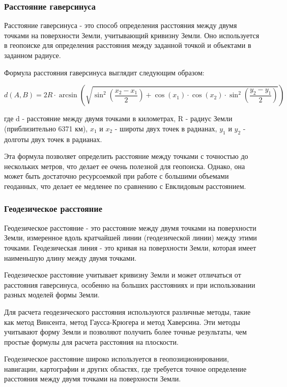 \subsubsection{Расстояние гаверсинуса}
Расстояние гаверсинуса - это способ определения расстояния между двумя точками на поверхности Земли, учитывающий кривизну Земли. Оно используется в геопоиске для определения расстояния между заданной точкой и объектами в заданном радиусе.

Формула расстояния гаверсинуса выглядит следующим образом:

$$
d(A, B) = 2R \cdot \arcsin\left(\sqrt{\sin^2\left(\frac{x_2-x_1}{2}\right) + \cos(x_1) \cdot \cos(x_2) \cdot \sin^2\left(\frac{y_2-y_1}{2}\right)}\right)
$$

где d - расстояние между двумя точками в километрах, R - радиус Земли (приблизительно 6371 км), $x_1$ и $x_2$ - широты двух точек в радианах, $y_1$ и $y_2$ - долготы двух точек в радианах.

Эта формула позволяет определить расстояние между точками с точностью до нескольких метров, что делает ее очень полезной для геопоиска. Однако, она может быть достаточно ресурсоемкой при работе с большими объемами геоданных, что делает ее медленее по сравнению с Евклидовым расстоянием.

\subsubsection{Геодезическое расстояние}
Геодезическое расстояние - это расстояние между двумя точками на поверхности Земли, измеренное вдоль кратчайшей линии (геодезической линии) между этими точками. Геодезическая линия - это кривая на поверхности Земли, которая имеет наименьшую длину между двумя точками.

Геодезическое расстояние учитывает кривизну Земли и может отличаться от расстояния гаверсинуса, особенно на больших расстояниях и при использовании разных моделей формы Земли.

Для расчета геодезического расстояния используются различные методы, такие как метод Винсента, метод Гаусса-Крюгера и метод Хаверсина. Эти методы учитывают форму Земли и позволяют получить более точные результаты, чем простые формулы для расчета расстояния на плоскости.

Геодезическое расстояние широко используется в геопозиционировании, навигации, картографии и других областях, где требуется точное определение расстояния между двумя точками на поверхности Земли.

